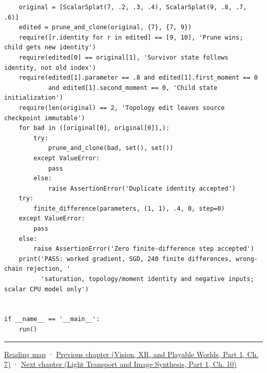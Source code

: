 \begin{verbatim}
    original = [ScalarSplat(7, .2, .3, .4), ScalarSplat(9, .8, .7, .6)]
    edited = prune_and_clone(original, {7}, {7, 9})
    require([r.identity for r in edited] == [9, 10], 'Prune wins; child gets new identity')
    require(edited[0] == original[1], 'Survivor state follows identity, not old index')
    require(edited[1].parameter == .8 and edited[1].first_moment == 0
            and edited[1].second_moment == 0, 'Child state initialization')
    require(len(original) == 2, 'Topology edit leaves source checkpoint immutable')
    for bad in ([original[0], original[0]],):
        try:
            prune_and_clone(bad, set(), set())
        except ValueError:
            pass
        else:
            raise AssertionError('Duplicate identity accepted')
    try:
        finite_difference(parameters, (1, 1), .4, 0, step=0)
    except ValueError:
        pass
    else:
        raise AssertionError('Zero finite-difference step accepted')
    print('PASS: worked gradient, SGD, 240 finite differences, wrong-chain rejection, '
          'saturation, topology/moment identity and negative inputs; scalar CPU model only')


if __name__ == '__main__':
    run()
\end{verbatim}

\begin{center}\rule{0.5\linewidth}{0.5pt}\end{center}

\hyperref[volume-reading-map]{Reading map} · \href{../07-Vision-XR-and-Playable-Worlds-P01/main.pdf\#nameddest=04-visual-computing-ii-ch038-projecting-ellipsoids-into-screen-space-conics}{Previous chapter (Vision, XR, and Playable Worlds, Part 1, Ch. 7)} · \href{../04-Light-Transport-and-Image-Synthesis-P01/main.pdf\#nameddest=04-visual-computing-ii-ch040-lighting-reconstruction-and-surface-motion}{Next chapter (Light Transport and Image Synthesis, Part 1, Ch. 10)}
